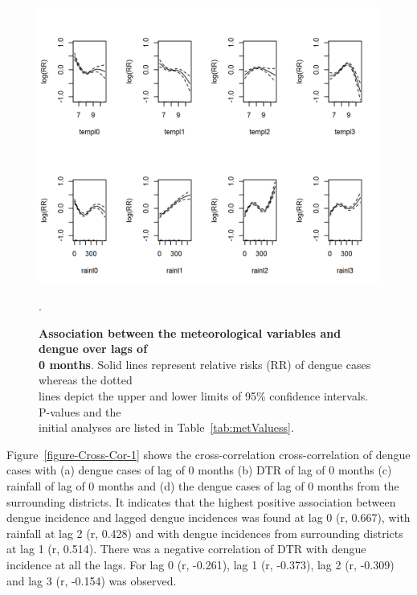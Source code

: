 \documentclass{bmcart}
\begin{document}
\begin{figure}[htbp]
	\begin{center}
		\includegraphics[width= 1.0\textwidth]{6-DM1}
		\caption{\textbf{Association between the meteorological variables and dengue over lags of \\ 0 months}. Solid lines represent relative risks (RR) of dengue cases whereas the dotted \\ lines depict the upper and lower limits of 95\%  confidence intervals. P-values and the \\ initial analyses are listed in Table~\ref{tab:metValuess}.}
		\label{figure:D-M-1}.
	\end{center}
\end{figure}





Figure~\ref{figure-Cross-Cor-1} shows the cross-correlation cross-correlation of dengue cases with (a) dengue cases of lag of 0 months (b) DTR of lag of 0 months (c) rainfall of lag of 0 months and (d) the dengue cases of lag of 0 months from the surrounding districts. It indicates that the highest positive association between dengue incidence and lagged dengue incidences was found at lag 0 (r, 0.667), with rainfall at lag 2 (r, 0.428) and with dengue incidences from surrounding districts at lag 1 (r, 0.514). There was a negative correlation of DTR with dengue incidence at all the lags. For lag 0 (r, -0.261), lag 1 (r, -0.373), lag 2 (r,  -0.309) and lag 3 (r,  -0.154) was observed. 
 
\end{document}
